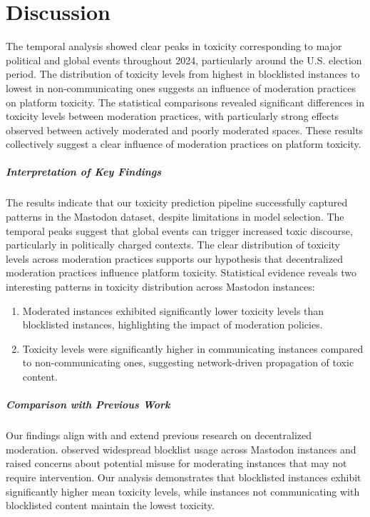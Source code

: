 \chapter{Discussion} \label{discussion}

The temporal analysis showed clear peaks in toxicity corresponding to major political and global events throughout 2024, particularly around the U.S. election period. The distribution of toxicity levels from highest in blocklisted instances to lowest in non-communicating ones suggests an influence of moderation practices on platform toxicity. The statistical comparisons revealed significant differences in toxicity levels between moderation practices, with particularly strong effects observed between actively moderated and poorly moderated spaces. These results collectively suggest a clear influence of moderation practices on platform toxicity.

\paragraph{Interpretation of Key Findings}
The results indicate that our toxicity prediction pipeline successfully captured patterns in the Mastodon dataset, despite limitations in model selection. The temporal peaks suggest that global events can trigger increased toxic discourse, particularly in politically charged contexts. The clear distribution of toxicity levels across moderation practices supports our hypothesis that decentralized moderation practices influence platform toxicity. Statistical evidence reveals two interesting patterns in toxicity distribution across Mastodon instances: 
\begin{enumerate}
    \item Moderated instances exhibited significantly lower toxicity levels than blocklisted instances, highlighting the impact of moderation policies.
    \item Toxicity levels were significantly higher in communicating instances compared to non-communicating ones, suggesting network-driven propagation of toxic content.
\end{enumerate}

\paragraph{Comparison with Previous Work}
Our findings align with and extend previous research on decentralized moderation. \citet{bono:2024} observed widespread blocklist usage across Mastodon instances and raised concerns about potential misuse for moderating instances that may not require intervention. Our analysis demonstrates that blocklisted instances exhibit significantly higher mean toxicity levels, while instances not communicating with blocklisted content maintain the lowest toxicity.

